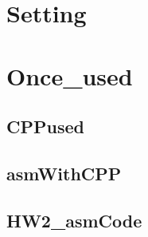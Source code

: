 \section{Setting}

\section{Once_used}
\subsection{CPPused}

\subsection{asmWithCPP}

\subsection{HW2_asmCode}

